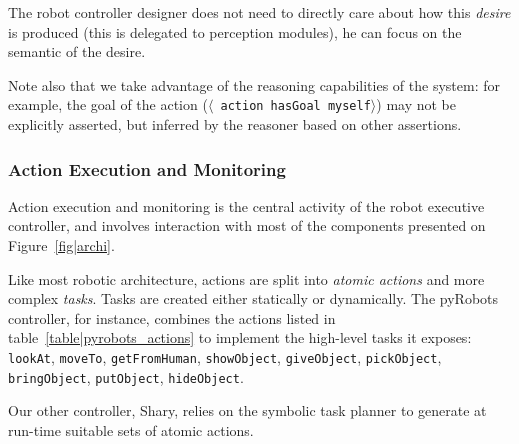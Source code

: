 \documentclass[preprint,3p,times]{elsarticle}
\newcommand{\stmt}[1]{{\footnotesize \tt $\langle$ #1\relax$\rangle$}}
\begin{document}
The robot controller designer does not need to directly care about how this
\emph{desire} is produced (this is delegated to perception modules), he can
focus on the semantic of the desire.

Note also that we take advantage of the reasoning capabilities of the system:
for example, the goal of the action (\stmt{action hasGoal myself}) may not be
explicitly asserted, but inferred by the reasoner based on other assertions.

\subsubsection{Action Execution and Monitoring}\label{sec:action}

Action execution and monitoring is the central activity of the robot executive
controller, and involves interaction with most of the components presented on
Figure~\ref{fig|archi}.

Like most robotic architecture, actions are split into \emph{atomic actions}
and more complex \emph{tasks}. Tasks are created either statically or dynamically.
The {\sc pyRobots} controller, for instance, combines the actions listed in
table~\ref{table|pyrobots_actions} to implement the high-level tasks it exposes: {\tt
lookAt}, {\tt moveTo}, {\tt getFromHuman}, {\tt showObject}, {\tt giveObject},
{\tt pickObject}, {\tt bringObject}, {\tt putObject}, {\tt hideObject}.

Our other controller, {\sc Shary}, relies on the symbolic task planner to
generate at run-time suitable sets of atomic actions.
\end{document}
